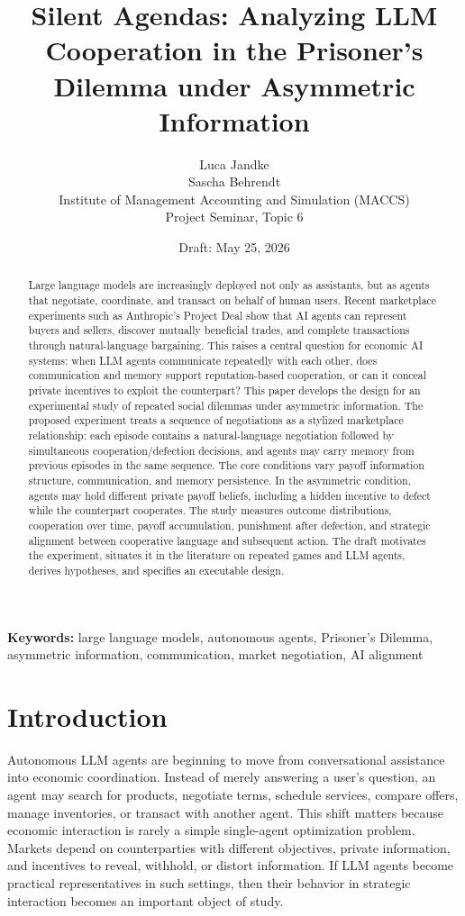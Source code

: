 \documentclass[12pt,a4paper]{article}
\title{\textbf{Silent Agendas: Analyzing LLM Cooperation in the Prisoner's Dilemma under Asymmetric Information}}
\author{Luca Jandke \\ Sascha Behrendt \\ Institute of Management Accounting and Simulation (MACCS) \\ Project Seminar, Topic 6}
\date{Draft: May 25, 2026}
\begin{document}
\maketitle

\begin{abstract}
Large language models are increasingly deployed not only as assistants, but as agents that negotiate, coordinate, and transact on behalf of human users. Recent marketplace experiments such as Anthropic's Project Deal show that AI agents can represent buyers and sellers, discover mutually beneficial trades, and complete transactions through natural-language bargaining. This raises a central question for economic AI systems: when LLM agents communicate repeatedly with each other, does communication and memory support reputation-based cooperation, or can it conceal private incentives to exploit the counterpart? This paper develops the design for an experimental study of repeated social dilemmas under asymmetric information. The proposed experiment treats a sequence of negotiations as a stylized marketplace relationship: each episode contains a natural-language negotiation followed by simultaneous cooperation/defection decisions, and agents may carry memory from previous episodes in the same sequence. The core conditions vary payoff information structure, communication, and memory persistence. In the asymmetric condition, agents may hold different private payoff beliefs, including a hidden incentive to defect while the counterpart cooperates. The study measures outcome distributions, cooperation over time, payoff accumulation, punishment after defection, and strategic alignment between cooperative language and subsequent action. The draft motivates the experiment, situates it in the literature on repeated games and LLM agents, derives hypotheses, and specifies an executable design.
\end{abstract}

\textbf{Keywords:} large language models, autonomous agents, Prisoner's Dilemma, asymmetric information, communication, market negotiation, AI alignment

\newpage

\section{Introduction}

Autonomous LLM agents are beginning to move from conversational assistance into economic coordination. Instead of merely answering a user's question, an agent may search for products, negotiate terms, schedule services, compare offers, manage inventories, or transact with another agent. This shift matters because economic interaction is rarely a simple single-agent optimization problem. Markets depend on counterparties with different objectives, private information, and incentives to reveal, withhold, or distort information. If LLM agents become practical representatives in such settings, then their behavior in strategic interaction becomes an important object of study.
\end{document}
